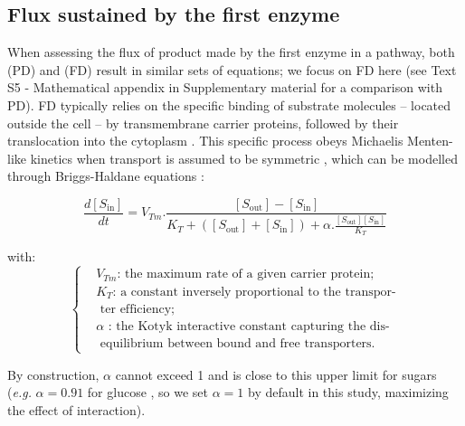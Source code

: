 \documentclass[11pt,onecolumn]{article}
\providecommand{\DIFadd}[1]{{\protect\color{blue} \sf #1}} %
\providecommand{\DIFdel}[1]{{\protect\color{red} \scriptsize #1}} %
\providecommand{\DIFaddbegin}{} %
\providecommand{\DIFaddend}{} %
\providecommand{\DIFdelbegin}{} %
\providecommand{\DIFdelend}{} %
\begin{document}
\subsection{Flux sustained by the first enzyme}

When assessing the flux of product made by the first enzyme in a pathway, both (PD) and (FD) result in similar sets of equations; we focus on FD here (see Text S5 - Mathematical appendix in Supplementary material for a comparison with PD). FD typically relies on the specific binding of substrate molecules -- located outside the cell -- by transmembrane carrier proteins, followed by their translocation into the cytoplasm \DIFdelbegin \DIFdel{\citep{danielli1954,Wilbrandt61,Kotyk67}}\DIFdelend \DIFaddbegin \DIFadd{\citep{danielli1954,Wilbrandt61,Kotyk67,Bosdriesz18}}\DIFaddend . This specific process obeys Michaelis Menten-like kinetics when transport is assumed to be symmetric \citep{Kotyk67}, which can be modelled through Briggs-Haldane equations \citep{Briggs25,Haldane30,Stein86d}:
\DIFaddbegin 

\DIFaddend \small
\begin{equation}
\frac{d[S_\text{in}]}{dt}=V_{Tm}.\frac{[S_\text{out}]-[S_\text{in}]}{K_T+([S_\text{out}]+[S_\text{in}])+\alpha.\frac{[S_\text{out}][S_\text{in}]}{K_T}}
\end{equation}
\normalsize

with:
\small
\begin{equation*}
  \left\{
      \begin{aligned}
		&V_{Tm}\text{: the maximum rate of a given carrier protein;}\\
		&K_T\text{: a constant inversely proportional to the transpor-}\\
		&\text{  ter efficiency};\\
		&\alpha \text{ : the Kotyk interactive constant  capturing the dis-}\\
		&\text{  equilibrium between bound and free transporters.}
      \end{aligned}
    \right.
\end{equation*}
\normalsize

By construction, $\alpha$ cannot exceed 1 \cite{Kotyk67} and is close to this upper limit for sugars (\textit{e.g.} $\alpha=0.91$ for glucose \citep{Teusink98}, so we set $\alpha=1$ by default in this study, maximizing the effect of interaction).
\end{document}
